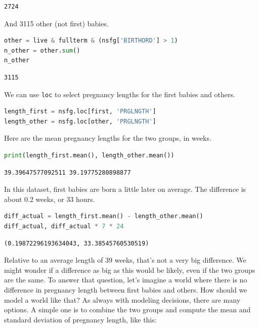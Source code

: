 \begin{lstlisting}[style=output]
2724
\end{lstlisting}

And 3115 other (not first) babies.

\begin{lstlisting}[language=Python,style=source]
other = live & fullterm & (nsfg['BIRTHORD'] > 1)
n_other = other.sum()
n_other
\end{lstlisting}

\begin{lstlisting}[style=output]
3115
\end{lstlisting}

We can use \passthrough{\lstinline!loc!} to select pregnancy lengths for
the first babies and others.

\begin{lstlisting}[language=Python,style=source]
length_first = nsfg.loc[first, 'PRGLNGTH']
length_other = nsfg.loc[other, 'PRGLNGTH']
\end{lstlisting}

Here are the mean pregnancy lengths for the two groups, in weeks.

\begin{lstlisting}[language=Python,style=source]
print(length_first.mean(), length_other.mean())
\end{lstlisting}

\begin{lstlisting}[style=output]
39.39647577092511 39.19775280898877
\end{lstlisting}

In this dataset, first babies are born a little later on average. The
difference is about 0.2 weeks, or 33 hours.

\begin{lstlisting}[language=Python,style=source]
diff_actual = length_first.mean() - length_other.mean()
diff_actual, diff_actual * 7 * 24
\end{lstlisting}

\begin{lstlisting}[style=output]
(0.19872296193634043, 33.38545760530519)
\end{lstlisting}

Relative to an average length of 39 weeks, that's not a very big
difference. We might wonder if a difference as big as this would be
likely, even if the two groups are the same. To answer that question,
let's imagine a world where there is no difference in pregnancy length
between first babies and others. How should we model a world like that?
As always with modeling decisions, there are many options. A simple one
is to combine the two groups and compute the mean and standard deviation
of pregnancy length, like this:

